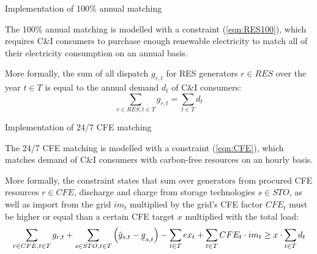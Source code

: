 \begin{frame}{Implementation of 100\% annual matching}

  {\small
  
The \alert{100\% annual matching} is modelled with a constraint (\ref{eqn:RES100}), which requires C\&I consumers 
to purchase enough renewable electricity to match all of their electricity consumption
on an annual basis.

\vspace{0.3cm}
More formally, the sum of all dispatch $g_{r,t}$ for RES generators $r\in RES$ over the year $t\in T$ 
is equal to the annual demand $d_t$ of C\&I consumers:
  \begin{equation}
    \sum_{r\in RES, t\in T} g_{r,t} = \sum_{t\in T} d_t
  \label{eqn:RES100}
  \end{equation}
  }
\end{frame}


\begin{frame}{Implementation of 24/7 CFE matching}

  {\small

  The \alert{24/7 CFE matching} is modelled with a constraint (\ref{eqn:CFE}), 
  which matches demand of C\&I consumers with carbon-free resources on an hourly basis. 

  More formally, the constraint states that sum over generators from procured CFE resources $r\in CFE$,
  discharge and charge from storage technologies $s\in STO$,
  as well as import from the grid $im_t$ multiplied by the grid's CFE factor $CFE_t$
  must be higher or equal than a certain CFE target $x$ multiplied with the total load:
  \vspace{0.1cm}
  \begin{equation}
  \sum_{r\in CFE, t\in T} g_{r,t} + \sum_{s\in STO, t\in T} \left(\bar{g}_{s,t} - \ubar{g}_{s,t}\right) - \sum_{t\in T} ex_t + \sum_{t\in T} CFE_t \cdot im_t \geq x \cdot \sum_{t\in T} d_t
  \label{eqn:CFE}
  \end{equation}
  \vspace{0.1cm}
  \noindent{}

  \noindent{}
  }

\end{frame}



